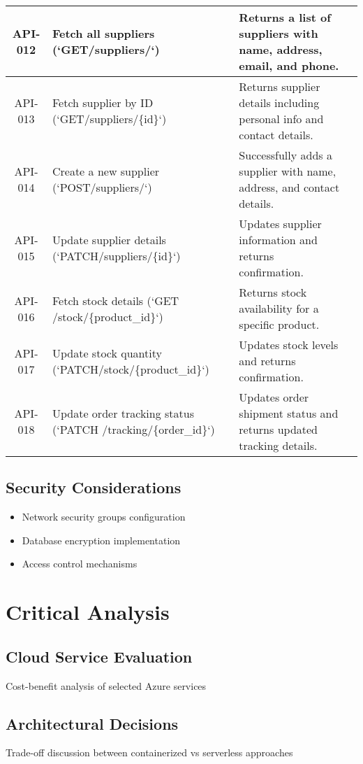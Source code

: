 \documentclass{llncs}
\begin{document}
\begin{longtable}{|c|>{\raggedright}p{7.5cm}|p{5.5cm}|p{2cm}|}
API-012 & Fetch all suppliers (`GET/suppliers/`) & Returns a list of suppliers with name, address, email, and phone. & \\ \hline
API-013 & Fetch supplier by ID (`GET/suppliers/\{id\}`) & Returns supplier details including personal info and contact details. & \\ \hline
API-014 & Create a new supplier (`POST/suppliers/`) & Successfully adds a supplier with name, address, and contact details. & \\ \hline
API-015 & Update supplier details (`PATCH/suppliers/\{id\}`) & Updates supplier information and returns confirmation. & \\ \hline
API-016 & Fetch stock details (`GET /stock/\{product\_id\}`) & Returns stock availability for a specific product. & \\ \hline
API-017 & Update stock quantity (`PATCH/stock/\{product\_id\}`) & Updates stock levels and returns confirmation. & \\ \hline
API-018 & Update order tracking status (`PATCH /tracking/\{order\_id\}`) & Updates order shipment status and returns updated tracking details. & \\ \hline
\end{longtable}

\subsection{Security Considerations}
\begin{itemize}
    \item Network security groups configuration
    \item Database encryption implementation
    \item Access control mechanisms
\end{itemize}

\section{Critical Analysis}
\subsection{Cloud Service Evaluation}
Cost-benefit analysis of selected Azure services

\subsection{Architectural Decisions}
Trade-off discussion between containerized vs serverless approaches
\end{document}
